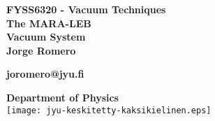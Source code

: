 \begin{titlepage}
	
    \begin{center}
        
        \Large{\textbf{FYSS6320 - Vacuum Techniques}}\\
        \vspace{0.15\textheight}
        \Huge{\textbf{The MARA-LEB\\Vacuum System}}\\
        \vspace{0.05\textheight}
      \Large{\textbf{Jorge Romero}}
      
      \large{\textbf{{joromero@jyu.fi}}}
    
 \vfill
        \large{\textbf{Department of Physics}}\\
   \vspace{1em}
    \texttt{[image: jyu-keskitetty-kaksikielinen.eps]}
    \end{center}
\end{titlepage}